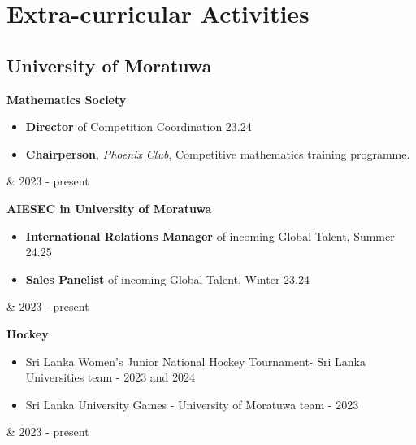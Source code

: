 \documentclass[10pt, a4paper]{article}
\newenvironment{highlights}{
        \begin{itemize}[
                topsep=0pt,
                parsep=0.10 cm,
                partopsep=0pt,
                itemsep=0pt,
                after=\vspace{-1\baselineskip},
                leftmargin=0.4 cm + 3pt
            ]
    }{
        \end{itemize}
    } %
\let\originalTabularx\tabularx
\let\originalEndTabularx\endtabularx
\renewenvironment{tabularx}{\bgroup\centering\originalTabularx}{\originalEndTabularx\par\egroup}
\begin{document}
     \section{Extra-curricular Activities}
	\subsection{University of Moratuwa}
		\begin{tabularx}{\textwidth-0.4 cm-0.13cm}{K{0.2 cm} R{4.1 cm}}
            \textbf{Mathematics Society}
            \vspace{0.10 cm}
            \begin{highlights}
                \item \textbf{Director} of Competition Coordination 23.24
                \item \textbf{Chairperson}, \textit{Phoenix Club}, Competitive mathematics training programme. \end{highlights}
            &
            2023 - present
           \end{tabularx}
			
		\vspace{0.2 cm}
		\begin{tabularx}{\textwidth-0.4 cm-0.13cm}{K{0.2 cm} R{4.1 cm}}
            \textbf{AIESEC in University of Moratuwa}
            \vspace{0.10 cm}
            \begin{highlights}
	        \item \textbf{International Relations Manager} of incoming Global Talent, Summer 24.25
	        \item \textbf{Sales Panelist} of incoming Global Talent, Winter 23.24
	        \end{highlights}
            &
            2023 - present
           \end{tabularx}
			
		\vspace{0.2 cm}	
		\begin{tabularx}{\textwidth-0.4 cm-0.13cm}{K{0.2 cm} R{4.1 cm}}
            \textbf{Hockey}
            \vspace{0.10 cm}
             \begin{highlights}
	        \item Sri Lanka Women's Junior National Hockey Tournament- Sri Lanka Universities team - 2023 and 2024
	        \item Sri Lanka University Games - University of Moratuwa team - 2023
	        \end{highlights}
            &
            2023 - present
           \end{tabularx}
\end{document}
